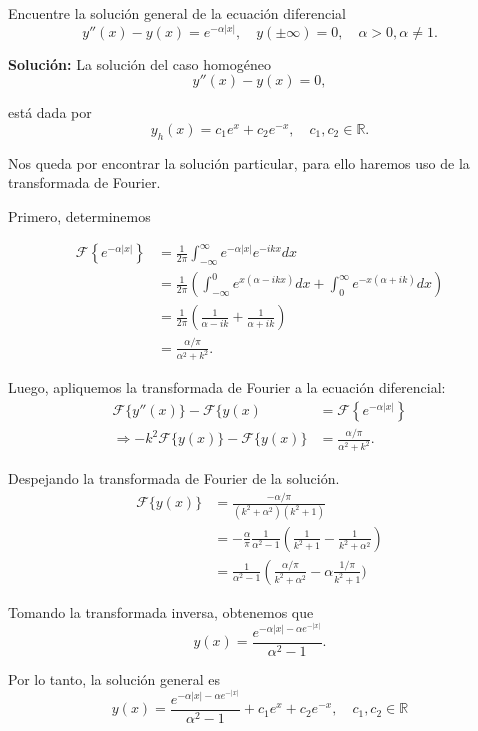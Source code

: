 \begin{ejemplo}
    Encuentre la solución general de la ecuación diferencial
    $$y''(x) - y(x) = e^{-\alpha |x|}, \quad y(\pm \infty) = 0, \quad \alpha > 0, \alpha \neq 1.$$

    \textbf{Solución:} La solución del caso homogéneo 
    $$y''(x) - y(x) = 0,$$

    está dada por
    $$y_h(x) = c_1 e^{x} + c_2 e^{-x}, \quad c_1,c_2 \in \mathbb{R}.$$

    Nos queda por encontrar la solución particular, para ello haremos uso de la transformada de Fourier. 

    Primero, determinemos 
    
    \begin{align*}
        \mathcal{F}\left\{ e^{-\alpha |x|} \right\} &= \frac{1}{2\pi} \int_{-\infty}^{\infty} e^{-\alpha |x|} e^{-ikx} dx \\
        &= \frac{1}{2\pi} \left(  \int_{-\infty}^{0} e^{x(\alpha -ikx)} dx +  \int_{0}^{\infty} e^{-x(\alpha + ik)} dx\right) \\
        &= \frac{1}{2\pi} \left( \frac{1}{\alpha -ik} + \frac{1}{\alpha +ik} \right) \\
        &= \frac{\alpha/\pi}{\alpha^2 + k^2}.
    \end{align*}

    Luego, apliquemos la transformada de Fourier a la ecuación diferencial:
    \begin{align*}
        \mathcal{F}\{ y''(x)\} - \mathcal{F}\{y(x)\ &=  \mathcal{F}\left\{ e^{-\alpha |x|} \right\} \\
        \Rightarrow - k^2 \mathcal{F}\{y(x)\} - \mathcal{F}\{y(x)\} &= \frac{\alpha/\pi}{\alpha^2 + k^2}.
    \end{align*}

    Despejando la transformada de Fourier de la solución.
    \begin{align*}
        \mathcal{F}\{y(x)\} &= \frac{-\alpha/\pi}{(k^2 + \alpha^2)(k^2+1)} \\
        &= - \frac{\alpha}{\pi} \frac{1}{\alpha^2-1} \left( \frac{1}{k^2+1} - \frac{1}{k^2+ \alpha^2}\right) \\
        &= \frac{1}{\alpha^2-1} \left( \frac{\alpha/\pi}{k^2 + \alpha^2} - \alpha \frac{1/\pi}{k^2+1} \right.)
    \end{align*}

    Tomando la transformada inversa, obtenemos que
    $$y(x) = \frac{e^{-\alpha|x| - \alpha e^{-|x|} }}{\alpha^2-1}.$$

    Por lo tanto, la solución general es
    $$\boxed{y(x) = \frac{e^{-\alpha|x| - \alpha e^{-|x|} }}{\alpha^2-1} + c_1 e^{x} + c_2 e^{-x}, \quad c_1,c_2 \in \mathbb{R}}$$
\end{ejemplo}

